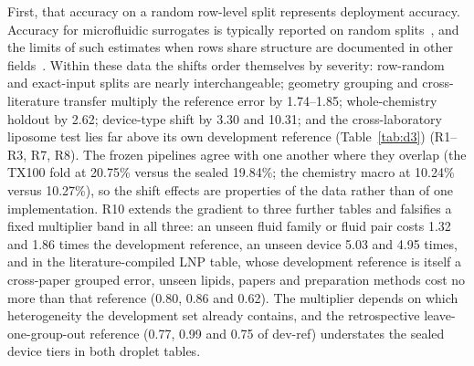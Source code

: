 \documentclass[11pt,a4paper]{article}
\newcommand{\tox}{TX100}
\begin{document}
First, that accuracy on a random row-level split represents deployment
accuracy. Accuracy for microfluidic surrogates is typically reported on
random splits~\cite{lashkaripour2021,lashkaripour2024,chagot2022,samari2025},
and the limits of such estimates when rows share structure are documented in
other fields~\cite{kapoor2023,sheridan2013,wu2018}. Within these data the
shifts order themselves by severity: row-random and exact-input splits are
nearly interchangeable; geometry grouping and cross-literature transfer
multiply the reference error by 1.74--1.85; whole-chemistry holdout by 2.62;
device-type shift by 3.30 and 10.31; and the cross-laboratory liposome test
lies far above its own development reference (Table~\ref{tab:d3}) (R1--R3,
R7, R8). The frozen pipelines agree with one another where they overlap (the
\tox{} fold at 20.75\% versus the sealed 19.84\%; the chemistry macro at
10.24\% versus 10.27\%), so the shift effects are properties of the data
rather than of one implementation. R10 extends the gradient to three
further tables and falsifies a fixed multiplier band in all three: an unseen
fluid family or fluid pair costs 1.32 and 1.86 times the development
reference, an unseen device 5.03 and 4.95 times, and in the literature-compiled
LNP table, whose development reference is itself a cross-paper grouped error,
unseen lipids, papers and preparation methods cost no more than that
reference (0.80, 0.86 and 0.62). The multiplier depends on which
heterogeneity the development set already contains, and the retrospective
leave-one-group-out reference (0.77, 0.99 and 0.75 of dev-ref) understates
the sealed device tiers in both droplet tables.
\end{document}
